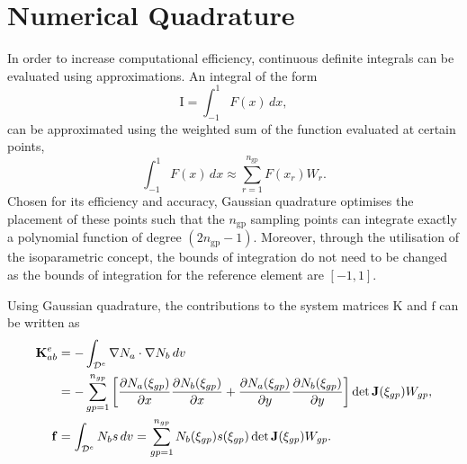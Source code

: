 \section{Numerical Quadrature} \label{sec:quadrature}
In order to increase computational efficiency, continuous definite integrals can be evaluated using approximations. An integral of the form
\begin{equation*}
    \mathrm{I} = \int^{1}_{-1} F(x) \,dx,
\end{equation*}
 can be approximated using the weighted sum of the function evaluated at certain points,
\begin{equation*}
    \int^{1}_{-1} F(x) \,dx \approx \sum^{n_{\text{gp}}}_{r=1} F(x_{r}) W_{r}.
\end{equation*}
Chosen for its efficiency and accuracy, Gaussian quadrature optimises the placement of these points such that the $n_{\text{gp}}$ sampling points can integrate
 exactly a polynomial function of degree $(2n_{\text{gp}}-1)$. Moreover, through the utilisation of the isoparametric concept, the bounds of integration do not need to
 be changed as the bounds of integration for the reference element are $[-1, 1]$.

Using Gaussian quadrature, the contributions to the system matrices $\boldsymbol{\mathrm{K}}$ and $\boldsymbol{\mathrm{f}}$
 can be written as 
 \begin{align} \label{quadrature_matrices}
    \boldsymbol{\mathrm{K}}^{e}_{ab} &= -\int_{\mathcal{D}^{e}} \nabla N_{a} \cdot \nabla N_{b} \, dv \notag\\ 
    & = - \sum^{n_{gp}}_{gp=1}\left[ \frac{\partial N_{a}(\xi_{gp})}{\partial x} \frac{\partial N_{b}(\xi_{gp})}{\partial x}
    + \frac{\partial N_{a}(\xi_{gp})}{\partial y} \frac{\partial N_{b}(\xi_{gp})}{\partial y}\right] \det \boldsymbol{\mathrm{J}}(\xi_{gp}) W_{gp}, \\
    \boldsymbol{\mathrm{f}} &= \int_{\mathcal{D}^{e}} N_{b} s\, dv = \sum^{n_{gp}}_{gp=1} N_{b}(\xi_{gp}) s(\xi_{gp}) \det \boldsymbol{\mathrm{J}}(\xi_{gp}) W_{gp}.
 \end{align}

